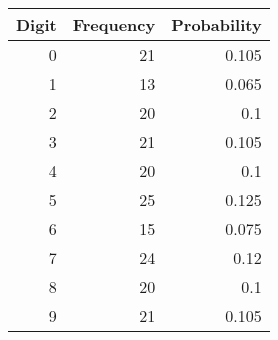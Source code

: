 
    \begin{tabular}{|r|r|r|}
    \toprule
    \hline
    \multicolumn{1}{|c|}{\textbf{Digit}} & \multicolumn{1}{c|}{\textbf{Frequency}} & \multicolumn{1}{c|}{\textbf{Probability}} \\
    \hline
    \midrule
    0     & 21    & 0.105 \\
    1     & 13    & 0.065 \\
    2     & 20    & 0.1 \\
    3     & 21    & 0.105 \\
    4     & 20    & 0.1 \\
    5     & 25    & 0.125 \\
    6     & 15    & 0.075 \\
    7     & 24    & 0.12 \\
    8     & 20    & 0.1 \\
    9     & 21    & 0.105 \\
    \hline
    \end{tabular}%


